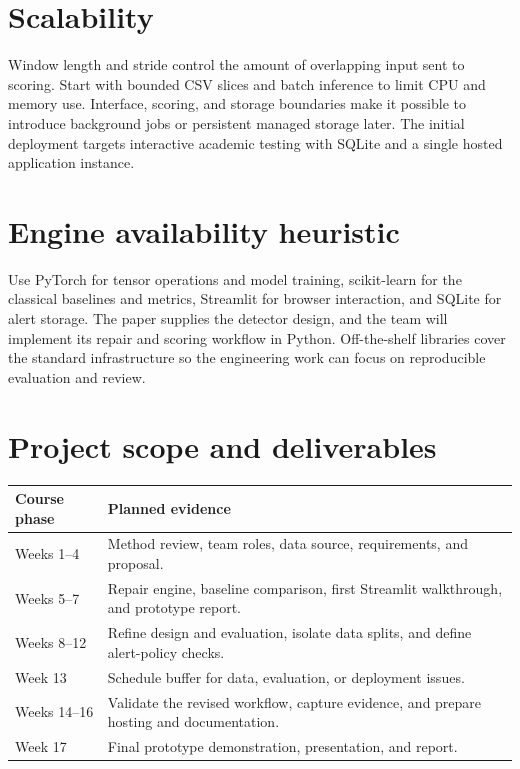 \documentclass[11pt,a4paper]{article}
\begin{document}
\section{Scalability}
Window length and stride control the amount of overlapping input sent to scoring. Start with bounded CSV slices and batch inference to limit CPU and memory use. Interface, scoring, and storage boundaries make it possible to introduce background jobs or persistent managed storage later. The initial deployment targets interactive academic testing with SQLite and a single hosted application instance.

\section{Engine availability heuristic}
Use PyTorch for tensor operations and model training, scikit-learn for the classical baselines and metrics, Streamlit for browser interaction, and SQLite for alert storage. The paper supplies the detector design, and the team will implement its repair and scoring workflow in Python. Off-the-shelf libraries cover the standard infrastructure so the engineering work can focus on reproducible evaluation and review.

\section{Project scope and deliverables}
\begin{center}
\begin{tabularx}{\linewidth}{@{}lX@{}}
\toprule
Course phase & Planned evidence\\
\midrule
Weeks 1--4 & Method review, team roles, data source, requirements, and proposal.\\
Weeks 5--7 & Repair engine, baseline comparison, first Streamlit walkthrough, and prototype report.\\
Weeks 8--12 & Refine design and evaluation, isolate data splits, and define alert-policy checks.\\
Week 13 & Schedule buffer for data, evaluation, or deployment issues.\\
Weeks 14--16 & Validate the revised workflow, capture evidence, and prepare hosting and documentation.\\
Week 17 & Final prototype demonstration, presentation, and report.\\
\bottomrule
\end{tabularx}
\end{center}
\end{document}

